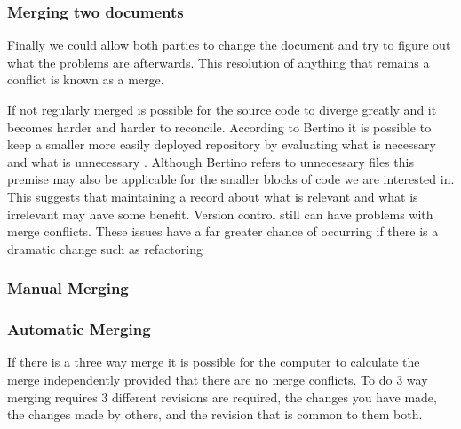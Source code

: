 \subsubsection{Merging two documents}
Finally we could allow both parties to change the document and try to figure out what the problems are afterwards.  This resolution of anything that remains a conflict is known as a merge.

If not regularly merged is possible for the source code to diverge greatly and it becomes harder and harder to reconcile.
 According to Bertino it is possible to keep a smaller more easily deployed repository by evaluating what is necessary and what is unnecessary \cite{Bertino2012}. Although Bertino refers to unnecessary files this premise may also be applicable for the smaller blocks of code we are interested in. This suggests that maintaining a record about what is relevant and what is irrelevant may have some benefit. Version control still can have problems with merge conflicts. These issues have a far greater chance of occurring if there is a dramatic change such as refactoring
 
\subsubsection{Manual Merging}


% 
% 

\subsubsection{Automatic Merging}
If there is a three way merge it is possible for the computer to calculate the merge independently provided that there are no merge conflicts.
To do 3 way merging requires 3 different revisions are required, the changes you have made, the changes made by others, and the revision that is common to them both.


% 

